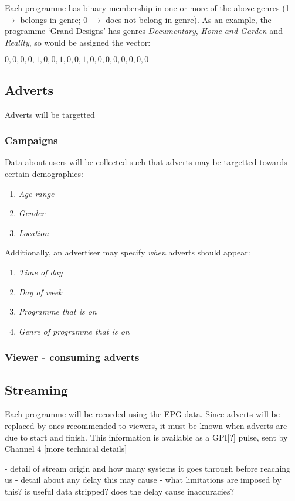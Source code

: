 Each programme has binary membership in one or more of the above genres (1 $\rightarrow$ belongs in genre; 0 $\rightarrow$ does not belong in genre). As an example, the programme `Grand Designs' has genres \emph{Documentary}, \emph{Home and Garden} and \emph{Reality}, so would be assigned the vector:
\begin{center}
	$0,0,0,0,1,0,0,1,0,0,1,0,0,0,0,0,0,0,0$
\end{center}


\subsection{Adverts}
\label{sec:design_adverts}

Adverts will be targetted

\subsubsection{Campaigns}

Data about users will be collected such that adverts may be targetted towards certain demographics:
\begin{enumerate}
\item \textit{Age range}
\item \textit{Gender}
\item \textit{Location}
\end{enumerate}

Additionally, an advertiser may specify \textit{when} adverts should appear:
\begin{enumerate}
\item \textit{Time of day}
\item \textit{Day of week}
\item \textit{Programme that is on}
\item \textit{Genre of programme that is on}
\end{enumerate}

\subsubsection{Viewer - consuming adverts}

\subsection{Streaming}
Each programme will be recorded using the EPG data. Since adverts will be replaced by ones recommended to viewers, it must be known when adverts are due to start and finish. This information is available as a GPI[?] pulse, sent by Channel 4 [more technical details]

- detail of stream origin and how many systems it goes through before reaching us
- detail about any delay this may cause
- what limitations are imposed by this? is useful data stripped? does the delay cause inaccuracies?

